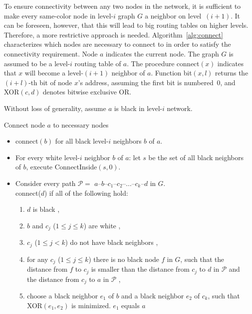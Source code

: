 \documentclass[conference]{IEEEtran}
\theoremstyle{definition}
\newcommand{\cP}{{\mathcal{P}}}
\newcommand{\cN}{{\mathcal{N}}}
\begin{document}
To ensure connectivity between any two nodes in the network, it is sufficient to make every same-color node in level-$i$ graph $G$ a neighbor on level~$(i+1)$. It can be foreseen, however, that this will lead to big routing tables on higher levels. Therefore, a more restrictive approach is needed. Algorithm~\ref{alg:connect} characterizes which nodes are necessary to connect to in order to satisfy the connectivity requirement. Node $a$ indicates the current node. The graph $G$ is assumed to be a level-$i$ routing table of $a$.
The procedure  connect$(x)$ indicates that $x$ will become a level-$(i+1)$ neighbor of $a$. Function bit$(x, l)$ returns the $(i + l)$-th bit of node $x$'s address, assuming the first bit is numbered~0, and XOR$(c, d)$ denotes bitwise exclusive OR.

Without loss of generality, assume $a$ is black in level-$i$ network.



\begin{algorithm}[H]
    \caption{Connect node $a$ to necessary nodes}
    \label{alg:connect}

    \begin{itemize} 
        \item   connect$(b)$ for all black level-$i$ neighbors $b$ of $a$.

        \item   For every white level-$i$ neighbor $b$ of $a$: 
                let $s$ be the set of all black neighbors of $b$, execute ConnectInside$(s, 0)$.

        \item   Consider every path $\cP = $ $a$--$b$--$c_1$--$c_2$--...--$c_k$--$d$ in $G$.  \\
        connect($d$) if all of the following hold:
        \begin{enumerate}
            \item   $d$ is black ,
            \item   $b$ and $c_j$ ($1 \le j \le k$) are white ,
            \item   $c_j$ ($1 \le j < k$) do not have black neighbors ,
            \item   for any $c_j$ ($1 \le j \le k$) there is no black node $f$ in $G$, such that the distance
                    from $f$ to $c_j$ is smaller than the distance
                    from $c_j$ to $d$ in $\cP$ and the distance from $c_j$ to $a$ in $\cP$ ,
            \item   choose a black neighbor $e_1$ of $b$ and a black neighbor $e_2$ of $c_k$,
                    such that XOR$(e_1, e_2)$ is minimized.
                    $e_1$ equals $a$
        \end{enumerate}
    \end{itemize} 
\end{algorithm}
\end{document}
